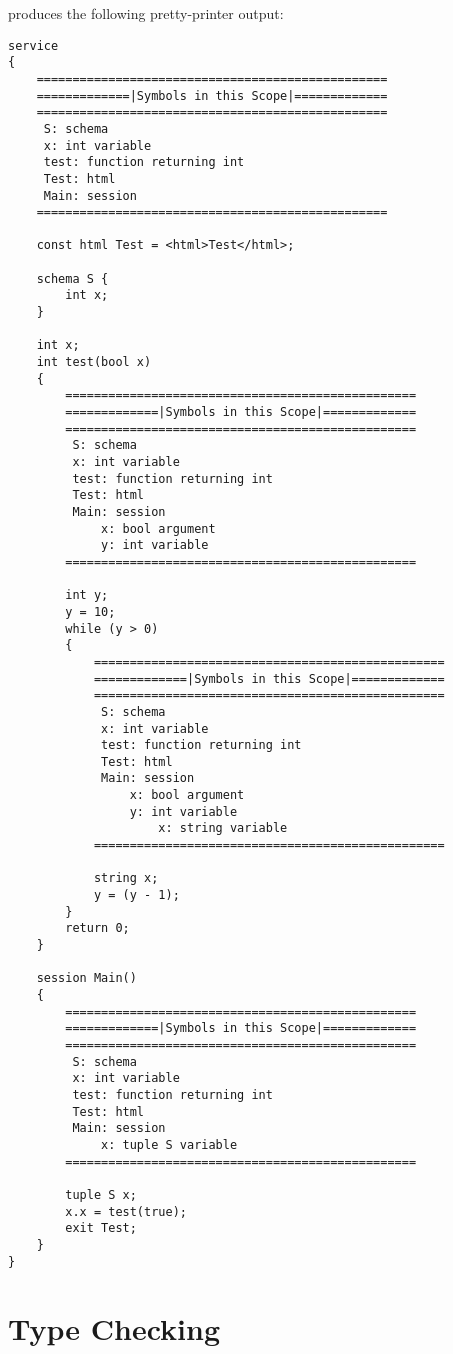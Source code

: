 \documentclass{WigReport}
\begin{document}
produces the following pretty-printer output:

\begin{verbatim}
service
{
    =================================================
    =============|Symbols in this Scope|=============
    =================================================
     S: schema
     x: int variable
     test: function returning int
     Test: html
     Main: session
    =================================================

    const html Test = <html>Test</html>;

    schema S {
        int x;
    }

    int x;
    int test(bool x)
    {
        =================================================
        =============|Symbols in this Scope|=============
        =================================================
         S: schema
         x: int variable
         test: function returning int
         Test: html
         Main: session
             x: bool argument
             y: int variable
        =================================================

        int y;
        y = 10;
        while (y > 0)
        {
            =================================================
            =============|Symbols in this Scope|=============
            =================================================
             S: schema
             x: int variable
             test: function returning int
             Test: html
             Main: session
                 x: bool argument
                 y: int variable
                     x: string variable
            =================================================

            string x;
            y = (y - 1);
        }
        return 0;
    }

    session Main()
    {
        =================================================
        =============|Symbols in this Scope|=============
        =================================================
         S: schema
         x: int variable
         test: function returning int
         Test: html
         Main: session
             x: tuple S variable
        =================================================

        tuple S x;
        x.x = test(true);
        exit Test;
    }
}
\end{verbatim}

\clearpage

\section{Type Checking}
\end{document}
